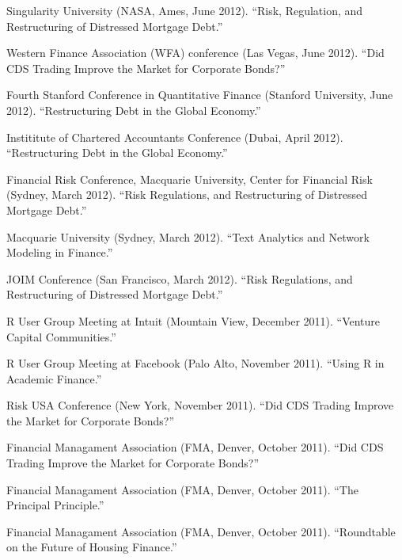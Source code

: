 \documentclass{article}
\begin{document}
\begin{etaremune}
{\item Singularity University (NASA, Ames, June 2012). ``Risk, Regulation, and Restructuring of Distressed Mortgage Debt.'' 

\item Western Finance Association (WFA) conference (Las Vegas, June 2012). ``Did CDS Trading Improve the Market for Corporate Bonds?''

\item Fourth Stanford Conference in Quantitative Finance (Stanford University, June 2012). ``Restructuring Debt in the Global Economy.''


\item Instititute of Chartered Accountants Conference (Dubai, April 2012). 
``Restructuring Debt in the Global Economy.''

\item Financial Risk Conference, Macquarie University, Center for Financial Risk (Sydney, March 2012).
``Risk Regulations, and Restructuring of Distressed Mortgage Debt.''

\item Macquarie University (Sydney, March 2012).
``Text Analytics and Network Modeling in Finance.''

\item JOIM Conference (San Francisco, March 2012).
``Risk Regulations, and Restructuring of Distressed Mortgage Debt.''

\item R User Group Meeting at Intuit (Mountain View, December 2011). 
``Venture Capital Communities.''

\item R User Group Meeting at Facebook (Palo Alto, November 2011).
``Using R in Academic Finance.''

\item Risk USA Conference (New York, November 2011).
``Did CDS Trading Improve the Market for Corporate Bonds?''

\item Financial Managament Association (FMA, Denver, October 2011).
``Did CDS Trading Improve the Market for Corporate Bonds?''

\item Financial Managament Association (FMA, Denver, October 2011).
``The Principal Principle.''

\item Financial Managament Association (FMA, Denver, October 2011).
``Roundtable on the Future of Housing Finance.''

}
\end{etaremune}
\end{document}
